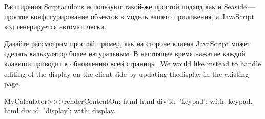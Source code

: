 \documentclass[a4paper,10pt,twoside]{book}
\begin{document}

Расширения Scrptaculous используют такой-же простой подход как и
Seaside\,---\,простое конфигурирование объектов в модель вашего приложения,
а JavaScript код генерируется автоматически.


Давайте рассмотрим простой пример, как на стороне клиена JavaScript может
сделать калькулятор более натуральным. В настоящее время нажатие каждой
клавиши приводит к обновлению всей страницы. We would like instead to handle editing of the display on the client-side by updating thedisplay in the existing page.



\begin{code}{}
MyCalculator>>>renderContentOn: html
	html div id: 'keypad'; with: keypad.
	html div id: 'display'; with: display.	
\end{code}
				
\end{document}
